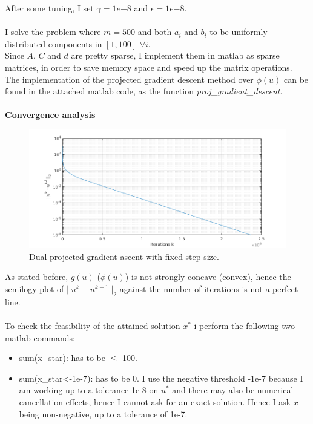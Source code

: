 \documentclass[]{article}
\begin{document}
After some tuning, I set $\gamma=1e{-8}$ and $\epsilon=1e{-8}$.\\\\
I solve the problem where $m=500$ and  both $a_i$ and $b_i$ to be uniformly distributed components in $[1,100]$ $\forall i$.\\
Since $A$, $C$ and $d$ are pretty sparse, I implement them in matlab as sparse matrices, in order to save memory space and speed up the matrix operations.\\
The implementation of the projected gradient descent method over $\phi(u)$ can be found in the attached matlab code, as the function \textit{proj\_gradient\_descent}.\\\\
\textbf{Convergence analysis}
\begin{figure}[H]
	\includegraphics[scale=0.55]{2_2.png}
	\caption{Dual projected gradient ascent with fixed step size.}
	\label{2_2}
\end{figure}
As stated before, $g(u)$ ($\phi(u)$) is not strongly concave (convex), hence the semilogy plot of  $||u^k-u^{k-1}||_2$ against the number of iterations is not a perfect line.\\\\
To check the feasibility of the attained solution $x^*$ i perform the following two matlab commands:
\begin{itemize}
	\item sum(x\_star): has to be $\leq$ 100.
	\item sum(x\_star<-1e-7): has to be 0. I use the negative threshold -1e-7 because I am working up to a tolerance 1e-8 on $u^*$ and there may also be numerical cancellation effects, hence I cannot ask for an exact solution. Hence I ask $x$ being non-negative, up to a tolerance of 1e-7.
\end{itemize}
\end{document}
